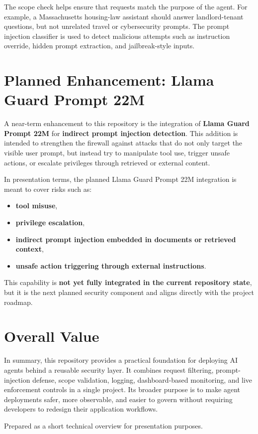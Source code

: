 \documentclass[11pt]{article}
\begin{document}
The scope check helps ensure that requests match the purpose of the agent. For example, a Massachusetts housing-law assistant should answer landlord-tenant questions, but not unrelated travel or cybersecurity prompts. The prompt injection classifier is used to detect malicious attempts such as instruction override, hidden prompt extraction, and jailbreak-style inputs.

\section*{Planned Enhancement: Llama Guard Prompt 22M}

A near-term enhancement to this repository is the integration of \textbf{Llama Guard Prompt 22M} for \textbf{indirect prompt injection detection}. This addition is intended to strengthen the firewall against attacks that do not only target the visible user prompt, but instead try to manipulate tool use, trigger unsafe actions, or escalate privileges through retrieved or external content.

In presentation terms, the planned Llama Guard Prompt 22M integration is meant to cover risks such as:

\begin{itemize}[leftmargin=1.2em]
    \item \textbf{tool misuse},
    \item \textbf{privilege escalation},
    \item \textbf{indirect prompt injection embedded in documents or retrieved context},
    \item \textbf{unsafe action triggering through external instructions}.
\end{itemize}

This capability is \textbf{not yet fully integrated in the current repository state}, but it is the next planned security component and aligns directly with the project roadmap.

\section*{Overall Value}

In summary, this repository provides a practical foundation for deploying AI agents behind a reusable security layer. It combines request filtering, prompt-injection defense, scope validation, logging, dashboard-based monitoring, and live enforcement controls in a single project. Its broader purpose is to make agent deployments safer, more observable, and easier to govern without requiring developers to redesign their application workflows.

\vfill
\begin{center}
\textcolor{slashdark}{\small Prepared as a short technical overview for presentation purposes.}
\end{center}
\end{document}
